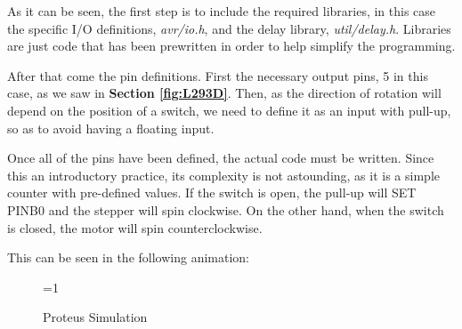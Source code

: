 As it can be seen, the first step is to include the required libraries, in this case the specific I/O definitions, \textit{avr/io.h}, and the delay library, \textit{util/delay.h}. Libraries are just code that has been prewritten in order to help simplify the programming.\medskip

\clearpage

After that come the pin definitions. First the necessary output pins, 5 in this case, as we saw in \textbf{Section \ref{fig:L293D}}. Then, as the direction of rotation will depend on the position of a switch, we need to define it as an input with pull-up, so as to avoid having a floating input. \medskip

Once all of the pins have been defined, the actual code must be written. Since this an introductory practice, its complexity is not astounding, as it is a simple counter with pre-defined values. If the switch is open, the pull-up will SET PINB0 and the stepper will spin clockwise. On the other hand, when the switch is closed, the motor will spin counterclockwise.\medskip

This can be seen in the following animation:


\begin{figure}[H]
    \centering
 
    \ifnum\value{ANIMATION}=1 {
    } 
    \fi
    
    \caption{Proteus Simulation}
    \label{fig:STEPPER_PROTEUS_ATMEGA}
\end{figure}


\clearpage












